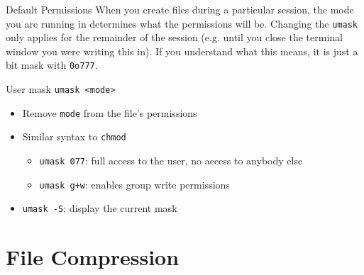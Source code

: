 \documentclass[11pt]{beamer}
\newcommand{\colbf}[1]{\textcolor{mLightBrown!77!black}{#1}}%
\begin{document}
\begin{frame}[fragile]{Default Permissions}
  When you create files during a particular session, the mode you are running in determines what the permissions
  will be.  Changing the \texttt{umask} only applies for the remainder of the session (e.g. until you close
  the terminal window you were writing this in).  If you understand what this means, it is just a bit mask with
  \texttt{0o777}.

  \begin{block}{\colbf{U}ser \colbf{mask}}
    \texttt{umask <mode>}
    \begin{itemize}
      \item Remove \texttt{mode} from the file's permissions
      \item Similar syntax to \texttt{chmod}
      \begin{itemize}
        \item \texttt{umask 077}: full access to the user, no access to anybody else
        \item \texttt{umask g+w}: enables group write permissions
      \end{itemize}
      \item \texttt{umask -S}: display the current mask
    \end{itemize}
  \end{block}
\end{frame}

%

%
\section{File Compression}
\label{sec:file_compression}
\end{document}
